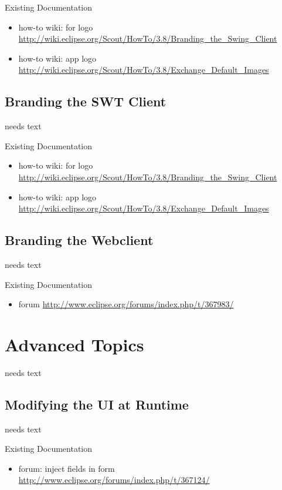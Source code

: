 \documentclass[a4paper,10pt,twoside]{book}
\begin{document}
{\noindent Existing Documentation
\begin{itemize}
  \item how-to wiki: for logo \url{http://wiki.eclipse.org/Scout/HowTo/3.8/Branding_the_Swing_Client}
  \item how-to wiki: app logo \url{http://wiki.eclipse.org/Scout/HowTo/3.8/Exchange_Default_Images}
\end{itemize}

\section{Branding the SWT Client}
needs text

\noindent Existing Documentation
\begin{itemize}
  \item how-to wiki: for logo \url{http://wiki.eclipse.org/Scout/HowTo/3.8/Branding_the_Swing_Client}
  \item how-to wiki: app logo \url{http://wiki.eclipse.org/Scout/HowTo/3.8/Exchange_Default_Images}
\end{itemize}

\section{Branding the Webclient}
needs text

\noindent Existing Documentation
\begin{itemize}
  \item forum \url{http://www.eclipse.org/forums/index.php/t/367983/}
\end{itemize}

\chapter{Advanced Topics}
needs text  

\section{Modifying the UI at Runtime}
needs text

\noindent Existing Documentation
\begin{itemize}
  \item forum: inject fields in form \url{http://www.eclipse.org/forums/index.php/t/367124/}
\end{itemize}

}
\end{document}
